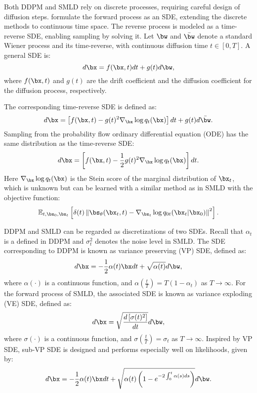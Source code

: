 Both DDPM and SMLD rely on discrete processes, requiring careful design of diffusion steps. \cite{SDE} formulate the forward process as an SDE, extending the discrete methods to continuous time space. The reverse process is modeled as a time-reverse SDE, enabling sampling by solving it. Let $\bw$ and $\bar{\bw}$ denote a standard Wiener process and its time-reverse, with continuous diffusion time $t \in [0, T]$. A general SDE is:
\begin{equation}
d\bx = f(\bx, t)dt + g(t)d\bw,
\end{equation}
where $f(\bx, t)$ and $g(t)$ are the drift coefficient and the diffusion coefficient for the diffusion process, respectively. 

The corresponding time-reverse SDE is defined as:
\begin{equation}
d\bx = \left[ f(\bx, t) - g(t)^2 \nabla_\bx \log q_t(\bx) \right] dt + g(t)d\bar{\bw}.
\end{equation}
Sampling from the probability flow ordinary differential equation (ODE) has the same distribution as the time-reverse SDE:
\begin{equation}
d\bx = \left[ f(\bx, t) - \frac{1}{2} g(t)^2 \nabla_\bx \log q_t(\bx) \right] dt.
\end{equation}
Here  $\nabla_\bx \log q_t(\bx)$ is the Stein score of the marginal
distribution of $\bx_t$, which is unknown but can be learned with a similar method as in
SMLD with the objective function:
\begin{equation}
\mathbb{E}_{t, \bx_0, \bx_t} \left[ \delta(t) \left\| \bs_\theta(\bx_t, t) - \nabla_{\bx_t} \log q_{0t}(\bx_t | \bx_0) \right\|^2 \right].
\label{eq:sde-objective}
\end{equation}

DDPM and SMLD can be regarded as discretizations of two SDEs.
Recall that $\alpha_t$ is a defined in DDPM and $\sigma_t^2$ denotes the noise level in SMLD. The SDE corresponding to DDPM is known as variance preserving (VP) SDE, defined as:
\begin{equation}
d\bx = -\frac{1}{2} \alpha(t)\bx dt + \sqrt{\alpha(t)}d\bw,
\end{equation}
where $\alpha(\cdot)$ is a continuous function, and $\alpha\left(\frac{t}{T}\right) = T(1 - \alpha_t)$ as $T \to \infty$. For the forward process of SMLD, the associated SDE is known as variance exploding (VE) SDE, defined
as:
\begin{equation}
d\bx = \sqrt{\frac{d \left[ \sigma(t)^2 \right]}{dt}} d\bw,
\end{equation}
where $\sigma(\cdot)$ is a continuous function, and $\sigma\left(\frac{t}{T}\right) = \sigma_t$ as $T \to \infty$.
Inspired by VP SDE, sub-VP SDE is designed and
performs especially well on likelihoods, given by:
\begin{equation}
d\bx = -\frac{1}{2} \alpha(t)\bx dt + \sqrt{\alpha(t) \left( 1 - e^{-2 \int_0^t \alpha(s)ds} \right)} d\bw.
\end{equation}

